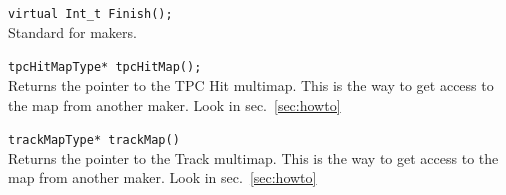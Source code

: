 \begin{Entry}
    \verb+virtual Int_t Finish();+\\
    Standard for makers.

    \verb+tpcHitMapType* tpcHitMap();+\\
    Returns the pointer to the TPC Hit multimap.  This is the way to get access to
    the map from another maker.  Look in sec.~\ref{sec:howto}

    \verb+trackMapType* trackMap()+\\
    Returns the pointer to the Track multimap.  This is the way to get access to
    the map from another maker.  Look in sec.~\ref{sec:howto}

\end{Entry}

%
%
